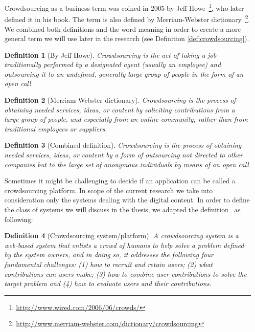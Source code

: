 \documentclass[ngerman,UKenglish,table]{scrbook}
\newtheorem{definition}{Definition}
\begin{document}
Crowdsourcing as a business term was coined in 2005 by Jeff Howe~\footnote{\url{http://www.wired.com/2006/06/crowds/}}, who later defined it in his book.
The term is also defined by Merriam-Webster dictionary~\footnote{\url{http://www.merriam-webster.com/dictionary/crowdsourcing}}.
We combined both definitions and the word meaning in order to create a more general term we will use later in the research (see Definition \autoref{def:crowdsourcing}).

\begin{definition}[By Jeff Howe]
Crowdsourcing is the act of taking a job traditionally performed by a designated agent (usually an employee) and outsourcing it to an undefined, generally large group of people in the form of an open call.
\end{definition}

\begin{definition}[Merriam-Webster dictionary]
Crowdsourcing is the process of obtaining needed services, ideas, or content by soliciting contributions from a large group of people, and especially from an online community, rather than from traditional employees or suppliers.
\end{definition}

\begin{definition}[Combined definition]
\label{def:crowdsourcing}
Crowdsourcing is the process of obtaining needed services, ideas, or content by a form of outsourcing not directed to other companies but to the large set of anonymous individuals by means of an open call.
\end{definition}

Sometimes it might be challenging to decide if an application can be called a crowdsourcing platform.
In scope of the current research we take into consideration only the systems dealing with the digital content. 
In order to define the class of systems we will discuss in the thesis, we adapted the definition~\cite{doan2011crowdsourcing} as following:

\begin{definition}[Crowdsourcing system/platform] 
\label{def:cs_system}
A crowdsourcing system is a web-based system that enlists a crowd of humans to help solve a problem defined by the system owners, and in doing so, it addresses the following four fundamental challenges: (1) how to recruit and retain users; (2) what contributions can users make; (3) how to combine user contributions to solve the target problem and (4) how to evaluate users and their contributions.
\end{definition}
\end{document}

